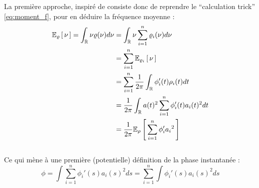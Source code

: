 La première approche, inspiré de \cite{cano_mathematical_2022} consiste donc de reprendre le ``calculation trick'' \eqref{eq:moment_f}, pour en déduire la fréquence moyenne :
\begin{align*}
	\esp[\densis]{\nu} = \int_\R \nu\densis(\nu)d\nu &= \int_\R \nu\sum_{i=1}^n \densis_i(\nu) d\nu \\
	&= \sum_{i=1}^n\esp[\densis_i]{\nu} \\
	&= \sum_{i=1}^n\frac{1}{2\pi}\int_\R \phi_i'(t)\densit_i(t)dt \\
	&= \frac{1}{2\pi}\int_\R a(t)^2\sum_{i=1}^n\phi_i'(t)a_i(t)^2 dt 
	\\ &= \frac{1}{2\pi} \esp[\densit]{\sum_{i=1}^n \phi_i'{a_i}^2}
\end{align*}
\\
Ce qui mène à une première (potentielle) définition de la phase instantanée :
\begin{equation}\label{eq:phas_inst_v1}
	\phi = \int \sum_{i=1}^n \phi_i'(s){a_i}(s)^2ds 
	= \sum_{i=1}^n \int \phi_i'(s){a_i}(s)^2ds 
\end{equation}
\\

